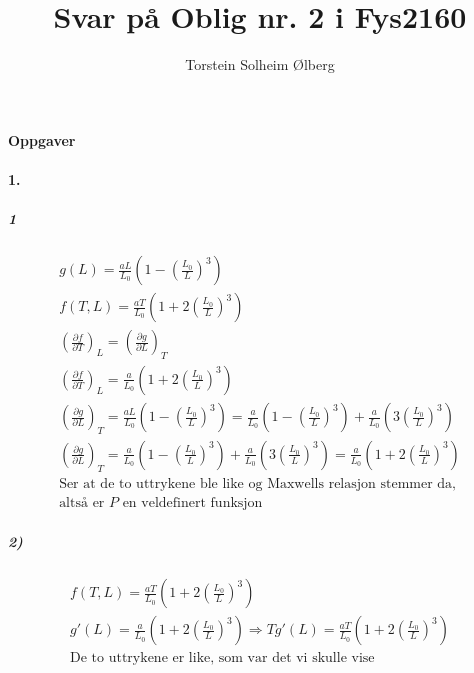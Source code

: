 \documentclass[11pt, A4paper, norsk]{article}
\author{Torstein Solheim Ølberg}
\title{Svar på Oblig nr. 2 i Fys2160}
\begin{document}
\maketitle
	\begin{center}
\Large \textbf{Oppgaver}
	\end{center}









		\paragraph{1.}
			\subparagraph{1}
				\begin{gather*}
g(L) = \frac{a L}{L_0} \left( 1 - \left( \frac{L_0}{L} \right)^3 \right) \\
f(T, L) = \frac{a T}{L_0} \left( 1 + 2 \left( \frac{L_0}{L} \right)^3 \right) \\
\left( \frac{\partial f}{\partial T} \right)_L = \left( \frac{\partial g}{\partial L} \right)_T \\
\left( \frac{\partial f}{\partial T} \right)_L = \frac{a}{L_0} \left( 1 + 2 \left( \frac{L_0}{L} \right)^3 \right) \\
\left( \frac{\partial g}{\partial L} \right)_T = \frac{a L}{L_0} \left( 1 - \left( \frac{L_0}{L} \right)^3 \right) = \frac{a}{L_0} \left( 1 - \left( \frac{L_0}{L} \right)^3 \right) + \frac{a}{L_0} \left( 3 \left( \frac{L_0}{L} \right)^3 \right) \\
\left( \frac{\partial g}{\partial L} \right)_T = \frac{a}{L_0} \left( 1 - \left( \frac{L_0}{L} \right)^3 \right) + \frac{a}{L_0} \left( 3 \left( \frac{L_0}{L} \right)^3 \right) = \frac{a}{L_0} \left( 1 + 2 \left( \frac{L_0}{L} \right)^3 \right) \\
\text{Ser at de to uttrykene ble like og Maxwells relasjon stemmer da,} \\
\text{altså er $P$ en veldefinert funksjon}
				\end{gather*}









			\subparagraph{2)}
				\begin{gather*}
f(T, L) = \frac{a T}{L_0} \left( 1 + 2 \left( \frac{L_0}{L} \right)^3 \right) \\
g'(L) = \frac{a}{L_0} \left( 1 + 2 \left( \frac{L_0}{L} \right)^3 \right) \Rightarrow T g'(L) = \frac{a T}{L_0} \left( 1 + 2 \left( \frac{L_0}{L} \right)^3 \right) \\
\text{De to uttrykene er like, som var det vi skulle vise}
				\end{gather*}
\end{document}
